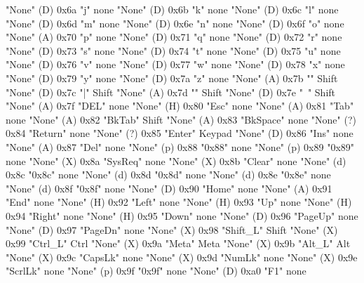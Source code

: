 "None"        (D)    0x6a    "j"           none
"None"        (D)    0x6b    "k"           none
"None"        (D)    0x6c    "l"           none
"None"        (D)    0x6d    "m"           none
"None"        (D)    0x6e    "n"           none
"None"        (D)    0x6f    "o"           none
"None"        (A)    0x70    "p"           none
"None"        (D)    0x71    "q"           none
"None"        (D)    0x72    "r"           none
"None"        (D)    0x73    "s"           none
"None"        (D)    0x74    "t"           none
"None"        (D)    0x75    "u"           none
"None"        (D)    0x76    "v"           none
"None"        (D)    0x77    "w"           none
"None"        (D)    0x78    "x"           none
"None"        (D)    0x79    "y"           none
"None"        (D)    0x7a    "z"           none
"None"        (A)    0x7b    "{"           Shift
"None"        (D)    0x7c    "|"           Shift
"None"        (A)    0x7d    "}"           Shift
"None"        (D)    0x7e    "~"           Shift
"None"        (A)    0x7f    "DEL"         none
"None"        (H)    0x80    "Esc"         none
"None"        (A)    0x81    "Tab"         none
"None"        (A)    0x82    "BkTab"       Shift
"None"        (A)    0x83    "BkSpace"     none
"None"        (?)    0x84    "Return"      none
"None"        (?)    0x85    "Enter"       Keypad
"None"        (D)    0x86    "Ins"         none
"None"        (A)    0x87    "Del"         none
"None"        (p)    0x88    "0x88"        none
"None"        (p)    0x89    "0x89"        none
"None"        (X)    0x8a    "SysReq"      none
"None"        (X)    0x8b    "Clear"       none
"None"        (d)    0x8c    "0x8c"        none
"None"        (d)    0x8d    "0x8d"        none
"None"        (d)    0x8e    "0x8e"        none
"None"        (d)    0x8f    "0x8f"        none
"None"        (D)    0x90    "Home"        none
"None"        (A)    0x91    "End"         none
"None"        (H)    0x92    "Left"        none
"None"        (H)    0x93    "Up"          none
"None"        (H)    0x94    "Right"       none
"None"        (H)    0x95    "Down"        none
"None"        (D)    0x96    "PageUp"      none
"None"        (D)    0x97    "PageDn"      none
"None"        (X)    0x98    "Shift_L"     Shift
"None"        (X)    0x99    "Ctrl_L"      Ctrl
"None"        (X)    0x9a    "Meta"        Meta
"None"        (X)    0x9b    "Alt_L"       Alt
"None"        (X)    0x9c    "CapsLk"      none
"None"        (X)    0x9d    "NumLk"       none
"None"        (X)    0x9e    "ScrlLk"      none
"None"        (p)    0x9f    "0x9f"        none
"None"        (D)    0xa0    "F1"          none
